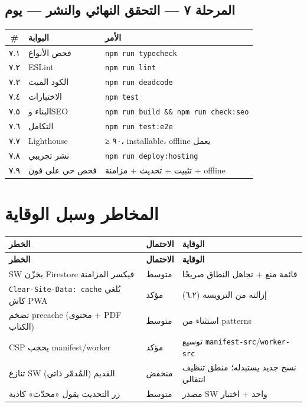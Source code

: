 \documentclass[11pt]{article}
\newcommand{\code}[1]{\textcolor{darkbg}{\texttt{\small #1}}}
\begin{document}
\subsection{المرحلة ٧ — التحقق النهائي والنشر — يوم}
\begin{tabular}{@{}c p{5cm} p{7cm}@{}}
\toprule
\textbf{\#} & \textbf{البوابة} & \textbf{الأمر} \\
\midrule
٧.١ & فحص الأنواع & \code{npm run typecheck} \\
٧.٢ & ESLint & \code{npm run lint} \\
٧.٣ & الكود الميت & \code{npm run deadcode} \\
٧.٤ & الاختبارات & \code{npm test} \\
٧.٥ & البناء وSEO & \code{npm run build \&\& npm run check:seo} \\
٧.٦ & التكامل & \code{npm run test:e2e} \\
٧.٧ & Lighthouse & ≥ ٩٠، installable، offline يعمل \\
٧.٨ & نشر تجريبي & \code{npm run deploy:hosting} \\
٧.٩ & فحص حي على فون & تثبيت + تحديث + مزامنة + offline \\
\bottomrule
\end{tabular}

\section{المخاطر وسبل الوقاية}
\begin{center}
\renewcommand{\arraystretch}{1.3}
\begin{longtable}{@{}p{6cm} p{2cm} p{6.5cm}@{}}
\toprule
\textbf{الخطر} & \textbf{الاحتمال} & \textbf{الوقاية} \\
\midrule
\endfirsthead
\toprule
\textbf{الخطر} & \textbf{الاحتمال} & \textbf{الوقاية} \\
\midrule
\endhead
SW يخزّن Firestore فيكسر المزامنة & متوسط & قائمة منع + تجاهل النطاق صريحًا \\
\code{Clear-Site-Data: cache} يُلغي كاش PWA & \textcolor{warnred}{مؤكد} & إزالته من الترويسة (٦.٢) \\
تضخم precache (محتوى + PDF الكتاب) & متوسط & استثناء من patterns \\
CSP يحجب manifest/worker & مؤكد & توسيع \code{manifest-src}/\code{worker-src} \\
تنازع SW القديم (المُدمّر ذاتي) & منخفض & نسخ جديد يستبدله؛ منطق تنظيف انتقالي \\
زر التحديث يقول «محدّث» كاذبة & متوسط & مصدر SW واحد + اختبار \\
\bottomrule
\end{longtable}
\end{center}
\end{document}
